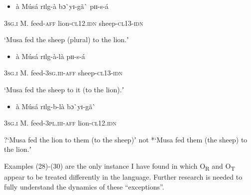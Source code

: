 \documentclass[output=paper]{langsci/langscibook}
\begin{document}
{{\begin{itemize}
\item \begin{styleNumberedEX}
\label{bkm:Ref424335625}\`{a}    M\'{u}s\'{a}  rɪlg-\`{a}    bɔ\`{ }yɪ-g\~{a}\`{ }    pɪɪ-s-\'{a}
\end{styleNumberedEX}\end{itemize}
\begin{styleGloss}
\textsc{3sg.i  }  M.  feed-\textsc{aff}  lion-\textsc{cl12.idn}  sheep-\textsc{cl13-idn}
\end{styleGloss}

\begin{styleTranslation}
‘Musa fed the sheep (plural) to the lion.ʼ
\end{styleTranslation}

\begin{itemize}
\item \begin{styleNumberedEX}
\label{bkm:Ref424317641}\`{a}    M\'{u}s\'{a}    rɪlg-\`{a}-l\`{a}    pɪɪ-s-\'{a}
\end{styleNumberedEX}\end{itemize}
\begin{styleGloss}
\textsc{3sg.i  }  M.    feed-\textsc{3sg.iii-aff}  sheep-\textsc{cl13-idn}
\end{styleGloss}

\begin{styleTranslation}
‘Musa fed the sheep to it (to the lion).ʼ
\end{styleTranslation}

\begin{itemize}
\item \begin{styleNumberedEX}
\label{bkm:Ref424317670}\`{a}    M\'{u}s\'{a}  rɪlg-b-l\`{a}      bɔ\`{ }yɪ-g\~{a}\`{ }
\end{styleNumberedEX}\end{itemize}
\begin{styleGloss}
\textsc{3sg.i  }  M.  feed-\textsc{3pl.iii-aff  }  lion-\textsc{cl12.idn}
\end{styleGloss}

\begin{styleTranslation}
?‘Musa fed the lion to them (to the sheep)ʼ not *‘Musa fed them (the sheep) to the lion.ʼ  
\end{styleTranslation}

Examples (28){}-(30) are the only instance I have found in which O\textsubscript{R} and O\textsubscript{T} appear to be treated differently in the language. Further research is needed to fully understand the dynamics of these “exceptions”.

}}
\end{document}
